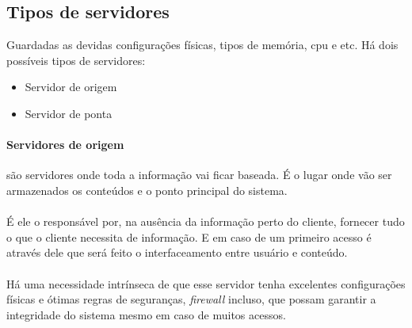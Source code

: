 \subsection{Tipos de servidores}
\label{section:tipos_de_servidores}
Guardadas as devidas configura\c{c}\~oes f\'isicas, tipos de mem\'oria, cpu e etc. H\'a dois poss\'iveis tipos de servidores:
\begin{itemize}
	\item Servidor de origem
	\item Servidor de ponta
\end{itemize}

\paragraph{Servidores de origem}s\~ao servidores onde toda a informa\c{c}\~ao vai ficar baseada. \'E o lugar onde v\~ao ser armazenados os conte\'udos e o ponto principal do sistema.
\paragraph{}
\'E ele o respons\'avel por, na aus\^encia da informa\c{c}\~ao perto do cliente, fornecer tudo o que o cliente necessita de informa\c{c}\~ao. E em caso de um primeiro acesso \'e atrav\'es dele que ser\'a feito o interfaceamento entre usu\'ario e conte\'udo.
\paragraph{}
H\'a uma necessidade intr\'inseca de que esse servidor tenha excelentes configura\c{c}\~oes f\'isicas e \'otimas regras de seguran\c{c}as, \textit{firewall} incluso, que possam garantir a integridade do sistema mesmo em caso de muitos acessos.

